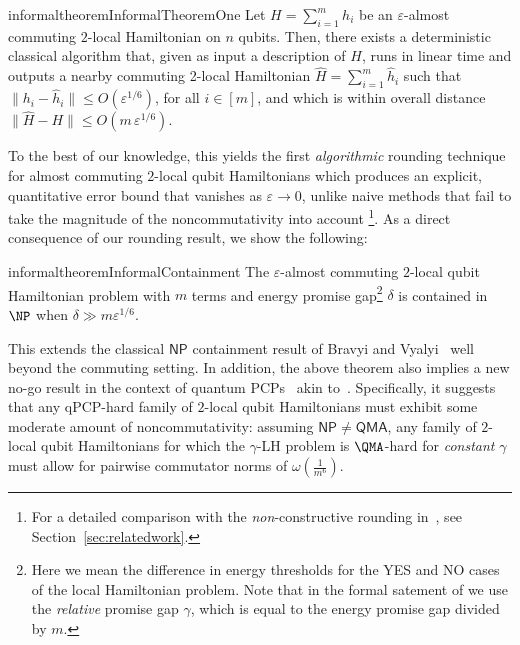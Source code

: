 \documentclass[a4paper,onecolumn,11pt]{quantumarticle}
\theoremstyle{plain}
\newcommand{\eps}{\varepsilon}
\begin{document}
\begin{restatable}{informaltheorem}{InformalTheoremOne}
Let $H=\sum_{i=1}^m h_i$ be an $\eps$-almost commuting $2$-local 
Hamiltonian on $n$ qubits. Then, there exists a deterministic classical algorithm that, given as input a description of $H$, runs 
in linear time and outputs a nearby commuting 2-local Hamiltonian $\hat{H}=\sum_{i=1}^m 
\hat{h}_i$ such that $\|h_i - \hat{h}_i\| \leq O(\eps^{1/6})$, for all 
$i \in [m]$, and which is within overall distance 
$\|\hat{H} - H\| \leq O(m \,\eps^{1/6})$.
\end{restatable}
To the best of our knowledge, this yields the first \emph{algorithmic} rounding technique for almost commuting $2$-local qubit Hamiltonians which produces an explicit, quantitative error bound that vanishes as $\varepsilon \rightarrow 0$, unlike naive methods that fail to take the magnitude of the noncommutativity into account
\footnote{For a detailed comparison with the \emph{non}-constructive rounding in~\cite{arad2011notepartialnogotheorem}, see Section~\ref{sec:relatedwork}.}.
As a direct consequence of our rounding result, we show the following:



\begin{restatable}{informaltheorem}{InformalContainment}
    The $\eps$-almost commuting $2$-local qubit Hamiltonian problem with $m$ terms and energy promise gap\footnote{Here we mean the difference in energy thresholds for the YES and NO cases of the local Hamiltonian problem. Note that in the formal satement of  we use the \emph{relative} promise gap $\gamma$, which is equal to the energy promise gap divided by $m$.} $\delta$ is contained in $\NP$ when $\delta \gg m \eps^{1/6}$.
\end{restatable}
This extends the classical $\mathsf{NP}$ containment result of Bravyi and Vyalyi~\cite{bravyi2004commutativeversionklocalhamiltonian} well
beyond the commuting setting.
In addition, the above theorem also implies a new no-go result in the context of quantum PCPs~\cite{aharonov2011complexity,Hastings2012} akin to~\cite{arad2011notepartialnogotheorem}. Specifically, it suggests that any qPCP-hard family of $2$-local qubit Hamiltonians must exhibit some moderate amount of noncommutativity: assuming $\mathsf{NP} \neq \mathsf{QMA}$, any
family of $2$-local qubit Hamiltonians for which the $\gamma$-LH problem is $\QMA$-hard for \emph{constant} $\gamma$ must allow for pairwise commutator norms of $\omega(\frac{1}{m^6})$.
\end{document}
